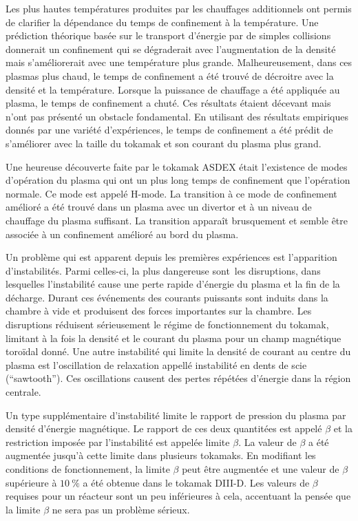 \documentclass[main.tex]{subfiles}
\begin{document}
Les plus hautes températures produites par les chauffages additionnels ont permis de clarifier la dépendance du temps de confinement à la température.
Une prédiction théorique basée sur le transport d'énergie par de simples collisions donnerait un confinement qui se dégraderait avec l'augmentation de la densité mais s'améliorerait avec une température plus grande.
Malheureusement, dans ces plasmas plus chaud, le temps de confinement a été trouvé de décroitre avec la densité et la température.
Lorsque la puissance de chauffage a été appliquée au plasma, le temps de confinement a chuté.
Ces résultats étaient décevant mais n'ont pas présenté un obstacle fondamental.
En utilisant des résultats empiriques donnés par une variété d'expériences, le temps de confinement a été prédit de s'améliorer avec la taille du tokamak et son courant du plasma plus grand.

Une heureuse découverte faite par le tokamak ASDEX était l'existence de modes d'opération du plasma qui ont un plus long temps de confinement que l'opération normale.
Ce mode est appelé H-mode.
La transition à ce mode de confinement amélioré a été trouvé dans un plasma avec un divertor et à un niveau de chauffage du plasma suffisant.
La transition apparaît brusquement et semble être associée à un confinement amélioré au bord du plasma.

Un problème qui est apparent depuis les premières expériences est l'apparition d'instabilités.
Parmi celles-ci, la plus dangereuse sont\ les disruptions, dans lesquelles l'instabilité cause une perte rapide d'énergie du plasma et la fin de la décharge.
Durant ces événements des courants puissants sont induits dans la chambre à vide et produisent des forces importantes sur la chambre.
Les disruptions réduisent sérieusement le régime de fonctionnement du tokamak, limitant à la fois la densité et le courant du plasma pour un champ magnétique toroïdal donné.
Une autre instabilité qui limite la densité de courant au centre du plasma est l'oscillation de relaxation appellé instabilité en dents de scie (``sawtooth'').
Ces oscillations causent des pertes répétées d'énergie dans la région centrale.

Un type supplémentaire d'instabilité limite le rapport de pression du plasma par densité d'énergie magnétique.
Le rapport de ces deux quantitées est appelé \( \beta \) et la restriction imposée par l'instabilité est appelée limite \( \beta \).
La valeur de \( \beta \) a été augmentée jusqu'à cette limite dans plusieurs tokamaks.
En modifiant les conditions de fonctionnement, la limite \( \beta \) peut être augmentée et une valeur de \( \beta \) supérieure à \( \SI{10}{\percent} \) a été obtenue dans le tokamak DIII-D.
Les valeurs de \( \beta \) requises pour un réacteur sont un peu inférieures à cela, accentuant la pensée que la limite \( \beta \) ne sera pas un problème sérieux.
\end{document}
